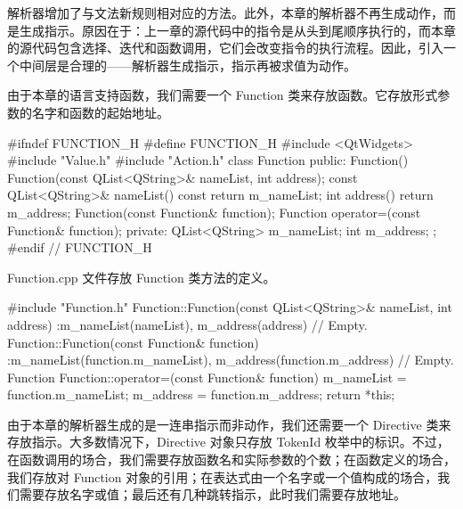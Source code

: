 解析器增加了与文法新规则相对应的方法。此外，本章的解析器不再生成动作，而是生成指示。原因在于：上一章的源代码中的指令是从头到尾顺序执行的，而本章的源代码包含选择、迭代和函数调用，它们会改变指令的执行流程。因此，引入一个中间层是合理的——解析器生成指示，指示再被求值为动作。

由于本章的语言支持函数，我们需要一个 Function 类来存放函数。它存放形式参数的名字和函数的起始地址。

\medskip{}

\begin{codebox}
#ifndef FUNCTION_H
#define FUNCTION_H
#include <QtWidgets>
#include "Value.h"
#include "Action.h"
class Function {
  public:
    Function() {}
    Function(const QList<QString>& nameList, int address);
    const QList<QString>& nameList() const {return m_nameList;}
    int address() {return m_address;}
    Function(const Function& function);
    Function operator=(const Function& function);
  private:
    QList<QString> m_nameList;
    int m_address;
};
#endif // FUNCTION_H
\end{codebox}

Function.cpp 文件存放 Function 类方法的定义。

\medskip{}

\begin{codebox}
#include "Function.h"
Function::Function(const QList<QString>& nameList, int address)
 :m_nameList(nameList),
  m_address(address) {
  // Empty.
}
Function::Function(const Function& function)
 :m_nameList(function.m_nameList),
  m_address(function.m_address) {
  // Empty.
}
Function Function::operator=(const Function& function) {
  m_nameList = function.m_nameList;
  m_address = function.m_address;
  return *this;
}
\end{codebox}

由于本章的解析器生成的是一连串指示而非动作，我们还需要一个 Directive 类来存放指示。大多数情况下，Directive 对象只存放 TokenId 枚举中的标识。不过，在函数调用的场合，我们需要存放函数名和实际参数的个数；在函数定义的场合，我们存放对 Function 对象的引用；在表达式由一个名字或一个值构成的场合，我们需要存放名字或值；最后还有几种跳转指示，此时我们需要存放地址。

\medskip{}

